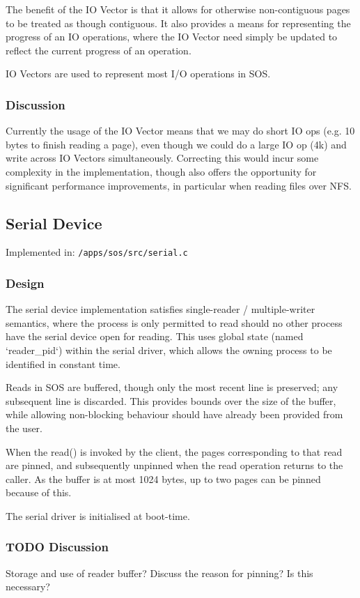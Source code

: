 \documentclass[a4paper,12pt]{article}
\begin{document}
The benefit of the IO Vector is that it allows for otherwise non-contiguous
pages to be treated as though contiguous.  It also provides a means for
representing the progress of an IO operations, where the IO Vector need simply
be updated to reflect the current progress of an operation.

IO Vectors are used to represent most I/O operations in SOS.

\subsubsection{Discussion}
Currently the usage of the IO Vector means that we may do short IO ops
(e.g. 10 bytes to finish reading a page), even though we could do a large IO
op (4k) and write across IO Vectors simultaneously.  Correcting this would
incur some complexity in the implementation, though also offers the
opportunity for significant performance improvements, in particular when
reading files over NFS.

\subsection{Serial Device}
Implemented in: \texttt{/apps/sos/src/serial.c}

\subsubsection{Design}
The serial device implementation satisfies single-reader / multiple-writer
semantics, where the process is only permitted to read should no other process
have the serial device open for reading.  This uses global state (named
`reader\_pid`) within the serial driver, which allows the owning process to be
identified in constant time.

Reads in SOS are buffered, though only the most recent line is preserved; any
subsequent line is discarded.  This provides bounds over the size of the
buffer, while allowing non-blocking behaviour should have already been
provided from the user.

When the read() is invoked by the client, the pages corresponding to that read
are pinned, and subsequently unpinned when the read operation returns to the
caller.  As the buffer is at most 1024 bytes, up to two pages can be pinned
because of this.

The serial driver is initialised at boot-time.

\subsubsection{TODO Discussion}
Storage and use of reader buffer?  Discuss the reason for pinning?  Is this necessary?
\end{document}

